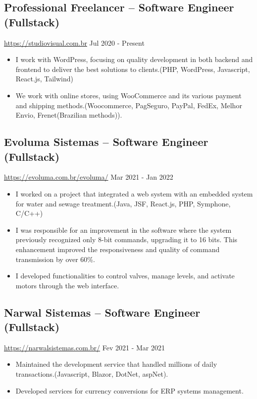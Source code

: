 \documentclass[11pt, a4paper]{article}
\begin{document}
\subsection*{Professional Freelancer -- Software Engineer (Fullstack)}
\href{https://evoluma.com.br/evoluma/}{https://studiovisual.com.br} \hfill Jul 2020 - Present
\begin{itemize}[noitemsep]
    \item I work with WordPress, focusing on quality development in both backend and frontend to deliver the best solutions to clients.(PHP, WordPress, Javascript, React.js, Tailwind)
    \item We work with online stores, using WooCommerce and its various payment and shipping methods.(Woocommerce, PagSeguro, PayPal, FedEx, Melhor Envio, Frenet(Brazilian methods)).
\end{itemize}

\subsection*{Evoluma Sistemas -- Software Engineer (Fullstack)}
\href{https://evoluma.com.br/evoluma/}{https://evoluma.com.br/evoluma/} \hfill Mar 2021 - Jan 2022
\begin{itemize}[noitemsep]
    \item I worked on a project that integrated a web system with an embedded system for water and sewage treatment.(Java, JSF, React.js, PHP, Symphone, C/C++)
    \item I was responsible for an improvement in the software where the system previously recognized only 8-bit commands, upgrading it to 16 bits. This enhancement improved the responsiveness and quality of command transmission by over 60\%.  
    \item I developed functionalities to control valves, manage levels, and activate motors through the web interface.
\end{itemize}

\subsection*{Narwal Sistemas -- Software Engineer (Fullstack)}
\href{https://www.narwalsistemas.com.br/}{https://narwalsistemas.com.br/} \hfill Fev 2021 - Mar 2021
\begin{itemize}[noitemsep]
    \item Maintained the development service that handled millions of daily transactions.(Javascript, Blazor, DotNet, aspNet).
    \item Developed services for currency conversions for ERP systems management.
\end{itemize}
\end{document}
